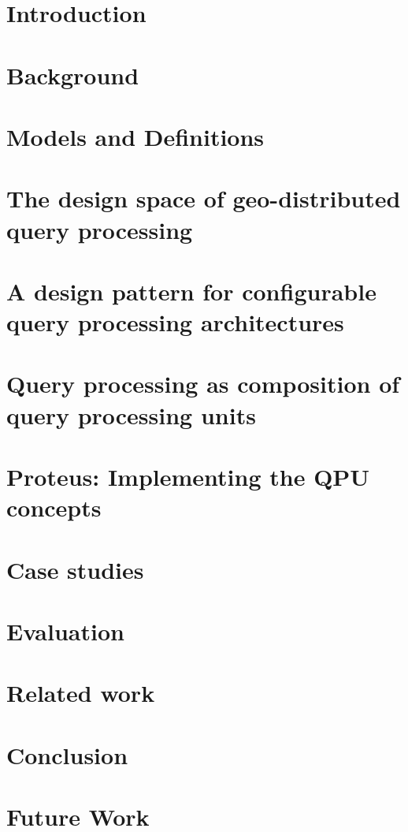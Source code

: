 \chapter{Introduction}
\label{ch:intro}


\chapter{Background}
\label{ch:background}


\chapter{Models and Definitions}
\label{ch:models}


\chapter{The design space of geo-distributed query processing}
\label{ch:design_space}


\chapter{A design pattern for configurable query processing architectures}
\label{ch:design_pattern}


\chapter{Query processing as composition of query processing units}
\label{ch:composition}


\chapter{Proteus: Implementing the QPU concepts}
\label{ch:proteus}


\chapter{Case studies}
\label{ch:case_studies}


\chapter{Evaluation}
\label{ch:evaluation}


\chapter{Related work}
\label{ch:related_work}


\chapter{Conclusion}
\label{ch:conclusion}


\chapter{Future Work}
\label{ch:future_work}

